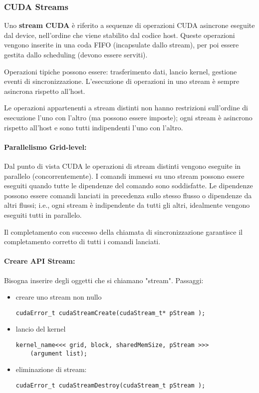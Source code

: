 \subsubsection{CUDA Streams}

Uno \textbf{stream CUDA} è riferito a sequenze di operazioni CUDA asincrone eseguite dal device, nell'ordine che viene stabilito dal codice host. Queste operazioni vengono inserite in una coda FIFO (incapsulate dallo stream), per poi essere gestita dallo scheduling (devono essere serviti). 

Operazioni tipiche possono essere: trasferimento dati, lancio kernel, gestione eventi di sincronizzazione. L'esecuzione di operazioni in uno stream è sempre asincrona rispetto all'host.

Le operazioni appartenenti a stream distinti non hanno restrizioni sull'ordine di esecuzione l'uno con l'altro (ma possono essere imposte); ogni stream è asincrono rispetto all'host e sono tutti indipendenti l'uno con l'altro.

\paragraph{Parallelismo Grid-level:} Dal punto di vista CUDA le operazioni di stream distinti vengono eseguite in parallelo (concorrentemente). I comandi immessi su uno stream possono essere eseguiti quando tutte le dipendenze del comando sono soddisfatte. Le dipendenze possono essere comandi lanciati in precedenza sullo stesso flusso o dipendenze da altri flussi; i.e., ogni stream è indipendente da tutti gli altri, idealmente vengono eseguiti tutti in parallelo.

Il completamento con successo della chiamata di sincronizzazione garantisce il completamento corretto di tutti i comandi lanciati.

\paragraph{Creare API Stream:} Bisogna inserire degli oggetti che si chiamano "stream". Passaggi: 
\begin{itemize}
	\item creare uno stream non nullo
	\begin{verbatim}
cudaError_t cudaStreamCreate(cudaStream_t* pStream );
	\end{verbatim}
	
	\item lancio del kernel
	\begin{verbatim}
kernel_name<<< grid, block, sharedMemSize, pStream >>>
	(argument list);
	\end{verbatim}
	
	\item eliminazione di stream:
	\begin{verbatim}
cudaError_t cudaStreamDestroy(cudaStream_t pStream );
	\end{verbatim}
\end{itemize}

